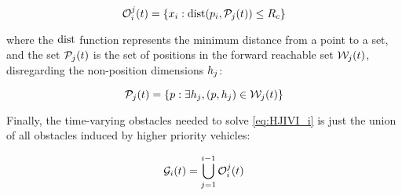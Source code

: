 \begin{equation}
\mathcal{O}_i^j(t) = \{x_i: \text{dist}(p_i, \mathcal{P}_j(t)) \le R_c \}
\end{equation}

\noindent where the $\text{dist}$ function represents the minimum distance from a point to a set, and the set $\mathcal{P}_j(t)$ is the set of positions in the forward reachable set $\mathcal{W}_j(t)$, disregarding the non-position dimensions $h_j$:

\begin{equation}
\mathcal{P}_j(t) = \{p: \exists h_j, (p, h_j) \in \mathcal{W}_j(t)\}
\end{equation}

Finally, the time-varying obstacles needed to solve \eqref{eq:HJIVI_i} is just the union of all obstacles induced by higher priority vehicles:

\begin{equation}
\mathcal{G}_i(t) = \bigcup_{j=1}^{i-1}\mathcal{O}_i^j(t)
\end{equation}